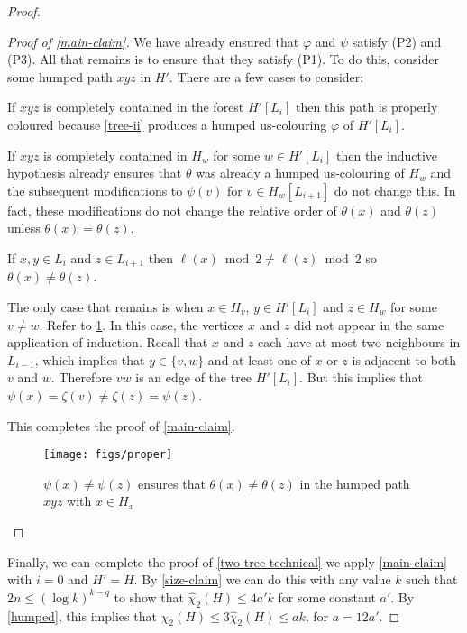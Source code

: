 \documentclass[kpfonts]{patmorin}
\newcommand{\uqs}{\chi_2}
\newcommand{\hus}{\hat{\chi}_2}
\begin{document}
\begin{proof}
\begin{proof}[Proof of \cref{main-claim}]
       We have already ensured that $\varphi$ and $\psi$ satisfy (P2) and (P3). All that remains is to ensure that they satisfy (P1).  To do this, consider some humped path $xyz$ in $H'$.  There are a few cases to consider:
       \begin{compactenum}
          \item If $xyz$ is completely contained in the forest $H'[L_i]$ then this path is properly coloured because \cref{tree-ii} produces a humped us-colouring $\varphi$ of $H'[L_i]$.
          \item If $xyz$ is completely contained in $H_w$ for some $w\in H'[L_i]$ then the inductive hypothesis already ensures that $\theta$ was already a humped us-colouring of $H_w$ and the subsequent modifications to $\psi(v)$ for $v\in H_w[L_{i+1}]$ do not change this. In fact, these modifications do not change the relative order of $\theta(x)$ and $\theta(z)$ unless $\theta(x)=\theta(z)$.
          \item If $x,y\in L_i$ and $z\in L_{i+1}$ then $\ell(x)\bmod 2\neq\ell(z)\bmod 2$ so $\theta(x)\neq\theta(z)$.
          \item The only case that remains is when $x\in H_{v}$, $y\in H'[L_i]$ and $z\in H_w$ for some $v\neq w$. Refer to \cref{proper}.  In this case, the vertices $x$ and $z$ did not appear in the same application of induction.  Recall that $x$ and $z$ each have at most two neighbours in $L_{i-1}$, which implies that $y\in\{v,w\}$ and at least one of $x$ or $z$ is adjacent to both $v$ and $w$.  Therefore $vw$ is an edge of the tree $H'[L_i]$.  But this implies that $\psi(x)=\zeta(v)\neq\zeta(z)=\psi(z)$.
      \end{compactenum}
      This completes the proof of \cref{main-claim}.
       \begin{figure}
           \begin{center}
            \texttt{[image: figs/proper]}
            \end{center}
           \caption{$\psi(x)\neq\psi(z)$ ensures that $\theta(x)\neq \theta(z)$ in the humped path $xyz$ with $x\in H_x$}
           \label{proper}
       \end{figure}
    \end{proof}
    Finally, we can complete the proof of \cref{two-tree-technical} we apply \cref{main-claim} with $i=0$ and $H'=H$.  By \cref{size-claim} we can do this with any value $k$ such that $2n \le (\log k)^{k-q}$ to show that $\hus(H)\le 4a'k$ for some constant $a'$.  By \cref{humped}, this implies that $\uqs(H)\le 3\hus(H)\le ak$, for $a=12a'$.
\end{proof}
\end{document}
